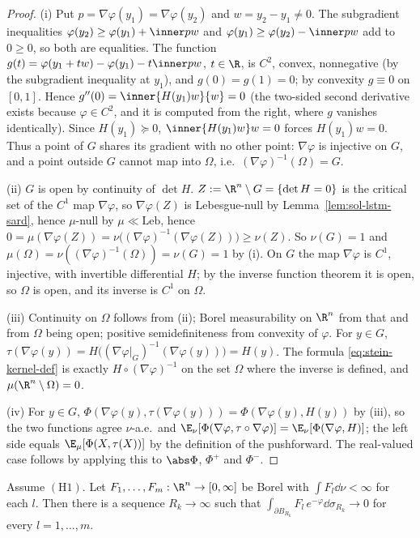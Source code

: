 \documentclass[../main.tex]{subfiles}
\begin{document}
\begin{proof}
(i) Put $p=\nabla\varphi(y_1)=\nabla\varphi(y_2)$ and $w=y_2-y_1\ne0$.  The subgradient
inequalities $\varphi(y_2)\ge\varphi(y_1)+\inner pw$ and $\varphi(y_1)\ge\varphi(y_2)-\inner pw$
add to $0\ge0$, so both are equalities.  The function
$g(t)=\varphi(y_1+tw)-\varphi(y_1)-t\inner pw$, $t\in\R$, is $C^2$, convex, nonnegative (by the
subgradient inequality at $y_1$), and $g(0)=g(1)=0$; by convexity $g\equiv0$ on $[0,1]$.
Hence $g''(0)=\inner{H(y_1)w}{w}=0$ (the two-sided second derivative exists because
$\varphi\in C^2$, and it is computed from the right, where $g$ vanishes identically).  Since
$H(y_1)\succeq0$, $\inner{H(y_1)w}w=0$ forces $H(y_1)w=0$.  Thus a point of $G$ shares its
gradient with no other point: $\nabla\varphi$ is injective on $G$, and a point outside $G$
cannot map into $\Omega$, i.e.\ $(\nabla\varphi)^{-1}(\Omega)=G$.

(ii) $G$ is open by continuity of $\det H$.  $Z:=\R^n\setminus G=\{\det H=0\}$ is the critical
set of the $C^1$ map $\nabla\varphi$, so $\nabla\varphi(Z)$ is Lebesgue-null by
Lemma~\ref{lem:sol-lstm-sard}, hence $\mu$-null by $\mu\ll\mathrm{Leb}$, hence
$0=\mu(\nabla\varphi(Z))=\nu\bigl((\nabla\varphi)^{-1}(\nabla\varphi(Z))\bigr)\ge\nu(Z)$.  So
$\nu(G)=1$ and $\mu(\Omega)=\nu((\nabla\varphi)^{-1}(\Omega))=\nu(G)=1$ by (i).  On $G$ the
map $\nabla\varphi$ is $C^1$, injective, with invertible differential $H$; by the inverse
function theorem it is open, so $\Omega$ is open, and its inverse is $C^1$ on $\Omega$.

(iii) Continuity on $\Omega$ follows from (ii); Borel measurability on $\R^n$ from that and
from $\Omega$ being open; positive semidefiniteness from convexity of $\varphi$.  For $y\in G$,
$\tau(\nabla\varphi(y))=H\bigl((\nabla\varphi|_G)^{-1}(\nabla\varphi(y))\bigr)=H(y)$.  The
formula \eqref{eq:stein-kernel-def} is exactly $H\circ(\nabla\varphi)^{-1}$ on the set
$\Omega$ where the inverse is defined, and $\mu(\R^n\setminus\Omega)=0$.

(iv) For $y\in G$, $\Phi(\nabla\varphi(y),\tau(\nabla\varphi(y)))=\Phi(\nabla\varphi(y),H(y))$
by (iii), so the two functions agree $\nu$-a.e.\ and
$\E_\nu[\Phi(\nabla\varphi,\tau\circ\nabla\varphi)]=\E_\nu[\Phi(\nabla\varphi,H)]$; the
left side equals $\E_\mu[\Phi(X,\tau(X))]$ by the definition of the pushforward.  The
real-valued case follows by applying this to $\abs\Phi$, $\Phi^+$ and $\Phi^-$.
\end{proof}

\begin{lemma}
\label{lem:sol-lstm-shells}
Assume $(\mathrm H1)$.  Let $F_1,\dots,F_m:\R^n\to[0,\infty]$ be Borel with
$\int F_l\dd\nu<\infty$ for each $l$.  Then there is a sequence $R_k\to\infty$ such that
$\int_{\partial B_{R_k}}F_l\,e^{-\varphi}\dd\sigma_{R_k}\to0$ for every $l=1,\dots,m$.
\end{lemma}
\end{document}
